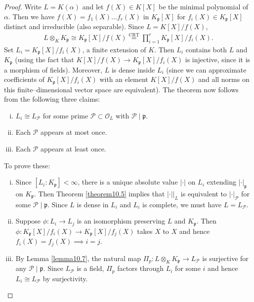 \documentclass{article}
\theoremstyle{definition}
\begin{document}
\begin{proof}
    Write $L = K(\alpha)$ and let $f(X) \in K[X]$ be the minimal polynomial of $\alpha$. Then we have $f(X) = f_1(X)\ldots f_r(X)$ in $K_{\mathfrak{p}}[X]$ for $f_i(X) \in K_{\mathfrak{p}}[X]$ distinct and irreducible (also separable). Since $L = K[X]/f(X)$, 
    \begin{align*}
        L \otimes_K K_{\mathfrak{p}} \cong K_{\mathfrak{p}}[X]/f(X) \stackrel{\text{CRT}}{=} \prod_{i=1}^{r} K_{\mathfrak{p}}[X]/f_i(X). 
    \end{align*}
    Set $L_i = K_{\mathfrak{p}}[X]/f_i(X)$, a finite extension of $K$. Then $L_i$ contains both $L$ and $K_{\mathfrak{p}}$ (using the fact that $K[X]/f(X) \to K_{\mathfrak{p}}[X]/f_i(X)$ is injective, since it is a morphism of fields). Moreover, $L$ is dense inside $L_i$ (since we can approximate coefficients of $K_{\mathfrak{p}}[X]/f_i(X)$ with an element $K[X]/f(X)$ and all norms on this finite--dimensional vector space are equivalent). The theorem now follows from the following three claims:
    \begin{enumerate}[(i)]
        \item $L_i \cong L_{\mathcal{P}}$ for some prime $\mathcal{P} \subset \mathcal{O}_L$ with $\mathcal{P} \mid \mathfrak{p}$.
        \item Each $\mathcal{P}$ appears at most once.
        \item Each $\mathcal{P}$ appears at least once.
    \end{enumerate}
    To prove these:
    \begin{enumerate}[(i)]
        \item Since $[L_i : K_{\mathfrak{p}}]<\infty$, there is a unique absolute value $|\cdot|$ on $L_i$ extending $|\cdot|_{\mathfrak{p}}$ on $K_{\mathfrak{p}}$. Then Theorem \ref{theorem10.5} implies that $|\cdot| |_{L}$ is equivalent to $|\cdot|_{\mathcal{P}}$ for some $\mathcal{P} \mid \mathfrak{p}$. Since $L$ is dense in $L_i$ and $L_i$ is complete, we must have $L = L_{\mathcal{P}}$.
        \item Suppose $\phi : L_i \to L_j$ is an isomorphism preserving $L$ and $K_{\mathfrak{p}}$. Then $\phi: K_{\mathfrak{p}}[X]/f_i(X) \to K_{\mathfrak{p}}[X]/f_j(X)$ takes $X$ to $X$ and hence $f_i(X) = f_j(X) \implies i = j$.
        \item By Lemma \ref{lemma10.7}, the natural map $\Pi_p : L \otimes_K K_{\mathfrak{p}} \to L_\mathcal{P}$ is surjective for any $\mathcal{P} \mid  \mathfrak{p}$. Since $L_\mathcal{P}$ is a field, $\Pi_p$ factors through $L_i$ for some $i$ and hence $L_i \cong L_{\mathcal{P}}$ by surjectivity.
    \end{enumerate}
\end{proof}
\end{document}
